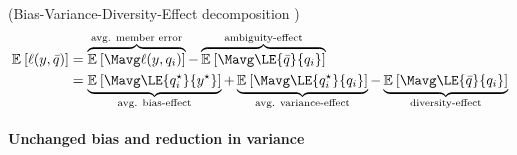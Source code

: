 \documentclass[../main.tex]{subfiles}
\begin{document}
\begin{theorem} (Bias-Variance-Diversity-Effect decomposition \cite{wood_UnifiedTheoryDiversity_2023} )
    \label{thm:bias-variance-diversity-effect-decomp}
\begin{align*}
\mathbb{E}_{}\left[ \ell(y, \bar{q} ) \right]  &=  
\overbrace{
\mathbb{E}_{}\left[ 
    \Mavg \ell(y, q_{i} ) 
\right]
}^{\text{avg. member error}}
-  
    \overbrace{
\mathbb{E}_{}\left[ 
        \Mavg \LE{\bar{q}}{q_{i}}  
    \right]  
    }^{\text{ambiguity-effect}} \\
&= 
    \underbrace{
\mathbb{E}_{}\left[ 
        \Mavg \LE{q_{i}^\star}{y^\star }
     \right]  
    }_{\text{avg. bias-effect}}
+
    \underbrace{
\mathbb{E}_{}\left[ 
        \Mavg \LE{q_{i}^\star}{q_{i}}  
\right]
    }_{\text{avg. variance-effect}}
-
    \underbrace{
 \mathbb{E}_{}\left[ 
        \Mavg \LE{\bar{q}}{q_{i}} 
\right] 
    }_{\text{diversity-effect}}
\end{align*}
\end{theorem}

\paragraph{Unchanged bias and reduction in variance}
\label{sec:unchanged-bias}
\end{document}
